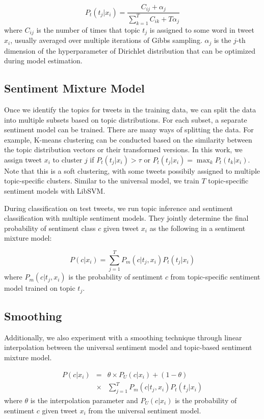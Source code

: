\documentclass[11pt]{article}
\begin{document}
\begin{equation}
\label{eq1}
P_t(t_j|x_i) = \frac{C_{ij}+\alpha_j}{\sum^T_{k=1}C_{ik}+T\alpha_j}
\end{equation}
where $C_{ij}$ is the number of times that topic $t_j$ is assigned to some word in tweet $x_i$, usually
averaged over multiple iterations of Gibbs sampling. $\alpha_j$ is the
$j$-th dimension of the hyperparameter of Dirichlet distribution that can be optimized during model estimation.

\subsection{Sentiment Mixture Model}
Once we identify the topics for tweets in the training data, we can split the data into multiple subsets
based on topic distributions. For each subset, a separate sentiment model can be trained. There are many
ways of splitting the data. For example, K-means clustering can be conducted based on the similarity between
the topic distribution vectors or their transformed versions. In this work, we assign tweet $x_i$ to cluster $j$
if $P_t(t_j|x_i) > \tau$ or $P_t(t_j|x_i) = \max_k P_t(t_k|x_i)$. Note that this is a soft clustering, with some
tweets possibily assigned to multiple topic-specific clusters. Similar to the universal model, we train $T$
topic-specific sentiment models with LibSVM. 

During classification on test tweets, we run topic inference
and sentiment classification with multiple sentiment models. They jointly determine the final probability
of sentiment class $c$ given tweet $x_i$ as the following in a sentiment mixture model:

\vspace{-5 mm}
\begin{equation}
P(c|x_i) = \sum_{j=1}^TP_m(c|t_j,x_i)P_t(t_j|x_i)
\end{equation}
where $P_m(c|t_j,x_i)$ is the probability of sentiment $c$ from topic-specific sentiment model trained on topic $t_j$.

\subsection{Smoothing}
Additionally, we also experiment with a smoothing technique through linear interpolation between the universal
sentiment model and topic-based sentiment mixture model.

\vspace{-5 mm}
\begin{eqnarray}
P(c|x_i) &=& \theta \times P_U(c|x_i)+(1-\theta) \nonumber \\ 
         &\times& \sum_{j=1}^TP_m(c|t_j,x_i)P_t(t_j|x_i)
\end{eqnarray}
where $\theta$ is the interpolation parameter and $P_U(c|x_i)$ is the probability of sentiment $c$ given tweet $x_i$
from the universal sentiment model.
\end{document}
